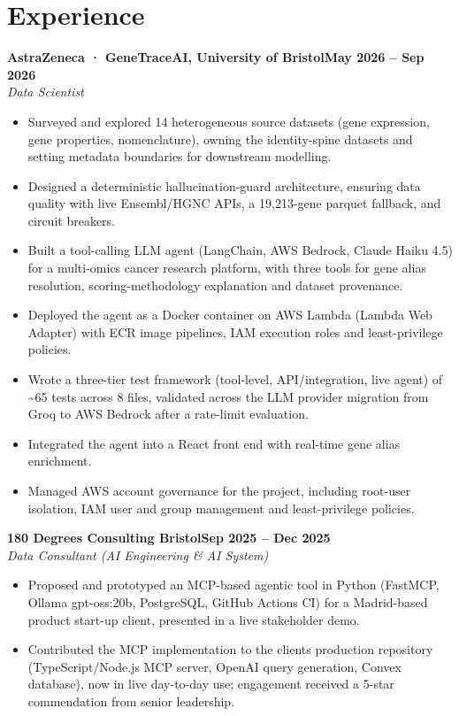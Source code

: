 \documentclass[a4paper,11pt]{article}
\newcommand{\entry}[4]{\needspace{4\baselineskip}\noindent\textbf{#1}\hfill\textbf{#2}\\ \textit{#3}\hfill\textit{#4}\par}
\begin{document}
\section{Experience}
\entry{AstraZeneca · GeneTraceAI, University of Bristol}{May 2026 – Sep 2026}{Data Scientist}{}
\begin{itemize}
  \item Surveyed and explored 14 heterogeneous source datasets (gene expression, gene properties, nomenclature), owning the identity-spine datasets and setting metadata boundaries for downstream modelling.
  \item Designed a deterministic hallucination-guard architecture, ensuring data quality with live Ensembl/HGNC APIs, a 19,213-gene parquet fallback, and circuit breakers.
  \item Built a tool-calling LLM agent (LangChain, AWS Bedrock, Claude Haiku 4.5) for a multi-omics cancer research platform, with three tools for gene alias resolution, scoring-methodology explanation and dataset provenance.
  \item Deployed the agent as a Docker container on AWS Lambda (Lambda Web Adapter) with ECR image pipelines, IAM execution roles and least-privilege policies.
  \item Wrote a three-tier test framework (tool-level, API/integration, live agent) of \textasciitilde{}65 tests across 8 files, validated across the LLM provider migration from Groq to AWS Bedrock after a rate-limit evaluation.
  \item Integrated the agent into a React front end with real-time gene alias enrichment.
  \item Managed AWS account governance for the project, including root-user isolation, IAM user and group management and least-privilege policies.
\end{itemize}
\vspace{4pt}
\entry{180 Degrees Consulting Bristol}{Sep 2025 – Dec 2025}{Data Consultant (AI Engineering \& AI System)}{}
\begin{itemize}
  \item Proposed and prototyped an MCP-based agentic tool in Python (FastMCP, Ollama gpt-oss:20b, PostgreSQL, GitHub Actions CI) for a Madrid-based product start-up client, presented in a live stakeholder demo.
  \item Contributed the MCP implementation to the client\textquotesingle{}s production repository (TypeScript/Node.js MCP server, OpenAI query generation, Convex database), now in live day-to-day use; engagement received a 5-star commendation from senior leadership.
\end{itemize}
\end{document}
